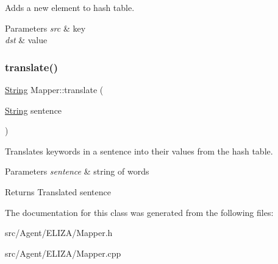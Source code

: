 Adds a new element to hash table. 
\begin{DoxyParams}{Parameters}
{\em src} & key \\
\hline
{\em dst} & value \\
\hline
\end{DoxyParams}
\mbox{\label{classMapper_a5badcd576626a91fc9b0f76345a64ba8}} 
\subsubsection{\texorpdfstring{translate()}{translate()}}
{\footnotesize\ttfamily \mbox{\hyperlink{classString}{String}} Mapper\+::translate (\begin{DoxyParamCaption}\item[{\mbox{\hyperlink{classString}{String}}}]{sentence }\end{DoxyParamCaption})}

Translates keywords in a sentence into their values from the hash table. 
\begin{DoxyParams}{Parameters}
{\em sentence} & string of words \\
\hline
\end{DoxyParams}
\begin{DoxyReturn}{Returns}
Translated sentence 
\end{DoxyReturn}


The documentation for this class was generated from the following files\+:\begin{DoxyCompactItemize}
\item 
src/\+Agent/\+E\+L\+I\+Z\+A/Mapper.\+h\item 
src/\+Agent/\+E\+L\+I\+Z\+A/Mapper.\+cpp\end{DoxyCompactItemize}
